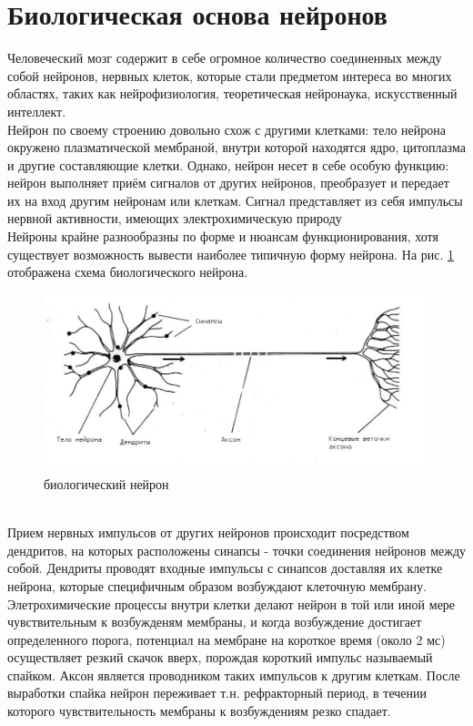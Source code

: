 \documentclass[a4paper,10pt]{article}
\begin{document}
\section{Биологическая основа нейронов}
\indent Человеческий мозг содержит в себе огромное количество соединенных между собой нейронов, нервных клеток, которые стали предметом интереса во многих областях, таких как нейрофизиология, теоретическая нейронаука, искусственный интеллект.\\
\indent Нейрон по своему строению довольно схож с другими клетками: тело нейрона окружено плазматической мембраной, внутри которой находятся ядро, цитоплазма и другие составляющие клетки. Однако, нейрон несет в себе особую функцию: нейрон выполняет приём сигналов от других нейронов, преобразует и передает их на вход другим нейронам или клеткам. Сигнал представляет из себя импульсы нервной активности, имеющих электрохимическую природу\\
\indent Нейроны крайне разнообразны по форме и нюансам функционирования, хотя существует возможность вывести наиболее типичную форму нейрона. На рис. \ref{bio_pic} отображена схема биологического нейрона. \\
\begin{figure}[ht]
\centering
\includegraphics[width=1\linewidth]{bio_neuron.jpg}
\caption{биологический нейрон}
\label{bio_pic}
\end{figure} \\
\indent Прием нервных импульсов от других нейронов происходит посредством дендритов, на которых расположены синапсы - точки соединения нейронов между собой. Дендриты проводят входные импульсы с синапсов доставляя их клетке нейрона, которые специфичным образом возбуждают клеточную мембрану.\\
\indent Элетрохимические процессы внутри клетки делают нейрон в той или иной мере чувствительным к возбужденям мембраны, и когда возбуждение достигает определенного порога, потенциал на мембране на короткое время (около 2 мс) осуществляет резкий скачок вверх, порождая короткий импульс называемый спайком. Аксон является проводником таких импульсов к другим клеткам. После выработки спайка нейрон переживает т.н. рефракторный период, в течении которого чувствительность мембраны к возбуждениям резко спадает.\\
\end{document}
